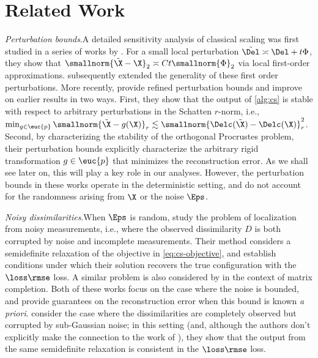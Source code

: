 \section{Related Work}
\label{sec:related-work}

\textit{Perturbation bounds}.\quad A detailed sensitivity analysis of classical scaling was first studied in a series of works by \cite{sibson1978studies,sibson1979studies,sibson1981studies}. For a small local perturbation {$\tilde{\Del} \asymp \Del + t\Phi$}, they show that {$\smallnorm{\tilde\X - \X}_2 \asymp C t \smallnorm{\Phi}_2$} via local first-order approximations. \cite{de2004sparse} subsequently extended the generality of these first order perturbations. More recently, \cite{arias2020perturbation} provide refined perturbation bounds and improve on earlier results in two ways. First, they show that the output of \cref{alg:cs} is stable with respect to arbitrary perturbations in the Schatten $r$-norm, i.e., ${\min_{g \in \euc{p}}\smallnorm{\tilde\X - g(\X)}_{r} \lesssim \smallnorm{\Delc(\tilde\X) - \Delc(\X)}_r^2}$. Second, by characterizing the stability of the orthogonal Procrustes problem, their  perturbation bounds explicitly characterize the arbitrary rigid transformation $g \in \euc{p}$ that minimizes the reconstruction error. As we shall see later on, this will play a key role in our analyses. However, the perturbation bounds in these works operate in the deterministic setting, and do not account for the randomness arising from $\X$ or the noise $\Eps$.

\textit{Noisy dissimilarities}.\quad When $\Eps$ is random, \cite{javanmard2013localization} study the problem of localization from noisy measurements, i.e., where the observed dissimilarity $D$ is both corrupted by noise and incomplete measurements. Their method considers a semidefinite relaxation of the objective in \cref{eq:cs-objective}, and establish conditions under which their solution recovers the true configuration with the $\loss\rmse$ loss. A similar problem is also considered by \cite{chatterjee2015matrix} in the context of matrix completion. Both of these works focus on the case where the noise is bounded, and provide guarantees on the reconstruction error when this bound is known \textit{a priori}. \cite{zhang2016distance} consider the case where the dissimilarities are completely observed but corrupted by \iid{} sub-Gaussian noise; in this setting (and, although the authors don't explicitly make the connection to the work of  \citealp{javanmard2013localization}), they show that the output from the same semidefinite relaxation is consistent in the $\loss\rmse$ loss.

